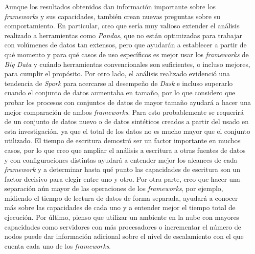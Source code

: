 Aunque los resultados obtenidos dan información importante sobre los \textit{frameworks} y sus capacidades, también crean nuevas preguntas sobre su comportamiento.
En particular, creo que sería muy valioso extender el análisis realizado a herramientas como \textit{Pandas}, que no están optimizadas para trabajar con volúmenes de datos tan extensos, pero que ayudarán a establecer a partir de qué momento y para qué casos de uso específicos es mejor usar los \textit{frameworks} de \textit{Big Data} y cuándo herramientas convencionales son suficientes, o incluso mejores, para cumplir el propósito. Por otro lado, el análisis realizado evidenció una tendencia de \textit{Spark} para acercarse al desempeño de \textit{Dask} e incluso superarlo cuando el conjunto de datos aumentaba en tamaño, por lo que considero que probar los procesos con conjuntos de datos de mayor tamaño ayudará a hacer una mejor comparación de ambos \textit{frameworks}. Para esto probablemente se requerirá de un conjunto de datos nuevo o de datos sintéticos creados a partir del usado en esta investigación, ya que el total de los datos no es mucho mayor que el conjunto utilizado.
El tiempo de escritura demostró ser un factor importante en muchos casos, por lo que creo que ampliar el análisis a escritura a otras fuentes de datos y con configuraciones distintas ayudará a entender mejor los alcances de cada \textit{framework} y a determinar hasta qué punto las capacidades de escritura son un factor decisivo para elegir entre uno y otro. Por otra parte, creo que hacer una separación aún mayor de las operaciones de los \textit{frameworks}, por ejemplo, midiendo el tiempo de lectura de datos de forma separada, ayudará a conocer más sobre las capacidades de cada uno y a entender mejor el tiempo total de ejecución. Por último, pienso que utilizar un ambiente en la nube con mayores capacidades como servidores con más procesadores o incrementar el número de nodos puede dar información adicional sobre el nivel de escalamiento con el que cuenta cada uno de los \textit{frameworks}.
